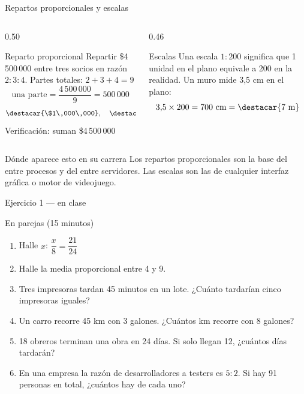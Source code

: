 \documentclass[aspectratio=169,10pt]{beamer}
\begin{document}
\begin{frame}{Repartos proporcionales y escalas}
  \scriptsize
  \begin{columns}[T,onlytextwidth]
    \begin{column}{0.50\textwidth}
      \begin{block}{Reparto proporcional}
        \tiny
        Repartir \$4\,500\,000 entre tres socios en razón $2:3:4$.
        \vspace{0.06cm}
        Partes totales: $2+3+4 = 9$
        \[ \text{una parte} = \frac{4\,500\,000}{9} = 500\,000 \]
        \[ \destacar{\$1\,000\,000},\quad \destacar{\$1\,500\,000},\quad
           \destacar{\$2\,000\,000} \]
        Verificación: suman \$4\,500\,000 \checkmark
      \end{block}
    \end{column}
    \begin{column}{0.46\textwidth}
      \begin{block}{Escalas}
        \tiny
        Una escala $1:200$ significa que 1 unidad en el plano equivale a 200 en
        la realidad.
        \vspace{0.06cm}
        Un muro mide 3,5 cm en el plano:
        \[ 3{,}5 \times 200 = 700 \text{ cm} = \destacar{7 \text{ m}} \]
      \end{block}
    \end{column}
  \end{columns}

  \vspace{0.08cm}
  \begin{alertblock}{Dónde aparece esto en su carrera}
    \tiny
    Los repartos proporcionales son la base del 
    entre procesos y del  entre servidores. Las
    escalas son las  de cualquier
    interfaz gráfica o motor de videojuego.
  \end{alertblock}
\end{frame}

\begin{frame}{Ejercicio 1 — en clase}
  \begin{alertblock}{En parejas (15 minutos)}
    \scriptsize
    \begin{enumerate}\setlength{\itemsep}{0.06cm}
      \item Halle $x$: \quad $\dfrac{x}{8} = \dfrac{21}{24}$
      \item Halle la media proporcional entre 4 y 9.
      \item Tres impresoras tardan 45 minutos en un lote. ¿Cuánto tardarían
            cinco impresoras iguales?
      \item Un carro recorre 45 km con 3 galones. ¿Cuántos km recorre con 8
            galones?
      \item 18 obreros terminan una obra en 24 días. Si solo llegan 12,
            ¿cuántos días tardarán?
      \item En una empresa la razón de desarrolladores a testers es $5:2$. Si
            hay 91 personas en total, ¿cuántos hay de cada uno?
    \end{enumerate}
  \end{alertblock}
\end{frame}
\end{document}
